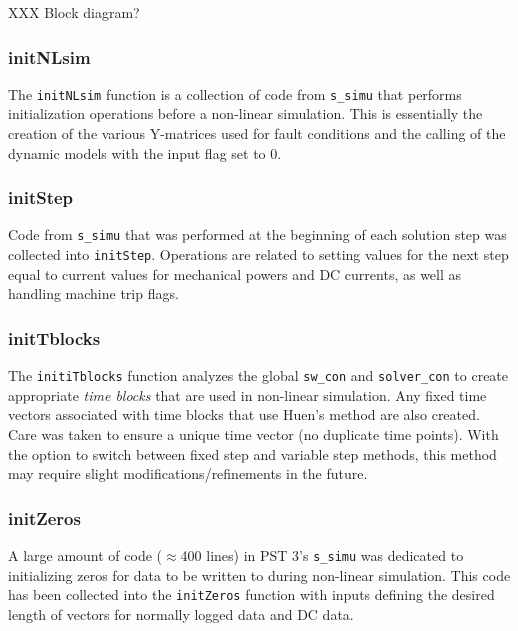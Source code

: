XXX Block diagram?


\subsubsection{initNLsim}  
The \verb|initNLsim| function is a collection of code from \verb|s_simu| that performs initialization operations before a non-linear simulation.
This is essentially the creation of the various Y-matrices used for fault conditions and the calling of the dynamic models with the input flag set to 0.

\subsubsection{initStep}  
Code from \verb|s_simu| that was performed at the beginning of each solution step was collected into \verb|initStep|.
Operations are related to setting values for the next step equal to current values for mechanical powers and DC currents, as well as handling machine trip flags.

\subsubsection{initTblocks}  
The \verb|initiTblocks| function analyzes the global \verb|sw_con| and \verb|solver_con| to create appropriate \emph{time blocks} that are used in non-linear simulation.
Any fixed time vectors associated with time blocks that use Huen's method are also created.
Care was taken to ensure a unique time vector (no duplicate time points).
With the option to switch between fixed step and variable step  methods, this method may require slight modifications/refinements in the future.

\subsubsection{initZeros}  
A large amount of code ($\approx$400 lines) in PST 3's \verb|s_simu| was dedicated to initializing zeros for data to be written to during non-linear simulation.
This code has been collected into the \verb|initZeros| function with inputs defining the desired length of vectors for normally logged data and DC data.

